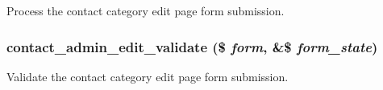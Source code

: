 Process the contact category edit page form submission. \hypertarget{contact_8admin_8inc_9ec44b6faaab7225ef53eb714f08d9a2}{
\subsubsection[{contact\_\-admin\_\-edit\_\-validate}]{\setlength{\rightskip}{0pt plus 5cm}contact\_\-admin\_\-edit\_\-validate (\$ {\em form}, \/  \&\$ {\em form\_\-state})}}
\label{contact_8admin_8inc_9ec44b6faaab7225ef53eb714f08d9a2}


Validate the contact category edit page form submission. 